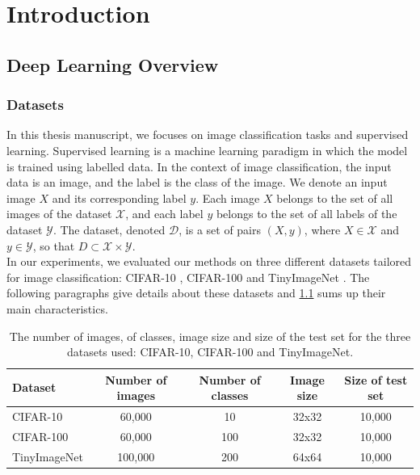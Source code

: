 \chapter{Introduction}
\section{Deep Learning Overview}

\subsection{Datasets}\label{sec:intro:datasets}

In this thesis manuscript, we focuses on image classification tasks and
supervised learning. Supervised learning is a machine learning paradigm in which
the model is trained using labelled data. In the context of image
classification, the input data is an image, and the label is the class of the
image. We denote an input image $X$ and its corresponding label $y$. Each image
$X$ belongs to the set of all images of the dataset $\mathcal{X}$, and each
label $y$ belongs to the set of all labels of the dataset $\mathcal{Y}$. The
dataset, denoted $\mathcal{D}$, is a set of pairs $(X, y)$, where $X \in
\mathcal{X}$ and $y \in \mathcal{Y}$, so that $D \subset \mathcal{X} \times
\mathcal{Y}$. \\

In our experiments, we evaluated our methods on three different datasets
tailored for image classification: CIFAR-10 \cite{CIFARdataset}, CIFAR-100
\cite{CIFARdataset} and TinyImageNet \cite{TinyImageNet}. The following
paragraphs give details about these datasets and \cref{tab:intro:datasets} sums
up their main characteristics.\\

\begin{table}[ht!]
    \centering
    \begin{tabular}{lcccc}
      \toprule
      \textbf{Dataset}    & \textbf{Number of images} & \textbf{Number of classes} &
      \textbf{Image size} & \textbf{Size of test set}                                               \\
      \hline
      CIFAR-10             & 60,000                    & 10                         & 32x32 & 10,000 \\
      CIFAR-100            & 60,000                    & 100                        & 32x32 & 10,000 \\
      TinyImageNet        & 100,000                   & 200                        & 64x64 & 10,000 \\
      \bottomrule
    \end{tabular}
    \caption{The number of images, of classes, image size and size of the test
    set for the three datasets used: CIFAR-10, CIFAR-100 and TinyImageNet.}
    \label{tab:intro:datasets}
  \end{table}

